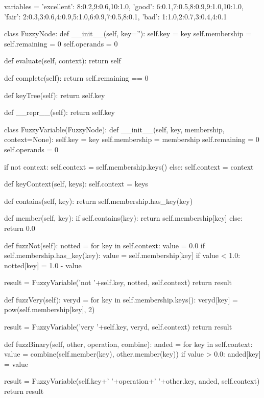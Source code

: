 \documentclass[12pt]{article}
\begin{document}
\begin{python}[]
variables = {
  'excellent': {8:0.2,9:0.6,10:1.0},
  'good': {6:0.1,7:0.5,8:0.9,9:1.0,10:1.0},
  'fair': {2:0.3,3:0.6,4:0.9,5:1.0,6:0.9,7:0.5,8:0.1},
  'bad': {1:1.0,2:0.7,3:0.4,4:0.1}
}

class FuzzyNode:
  def __init__(self, key=''):
    self.key = key
    self.membership = {}
    self.remaining = 0
    self.operands = 0

  def evaluate(self, context):
    return self

  def complete(self):
    return self.remaining == 0

  def keyTree(self):
    return self.key

  def __repr__(self):
    return self.key

class FuzzyVariable(FuzzyNode):
  def __init__(self, key, membership, context=None):
    self.key = key
    self.membership = membership
    self.remaining = 0
    self.operands = 0

    if not context:
      self.context = self.membership.keys()
    else:
      self.context = context

  def keyContext(self, keys):
    self.context = keys

  def contains(self, key):
    return self.membership.has_key(key)

  def member(self, key):
    if self.contains(key):
      return self.membership[key]
    else:
      return 0.0

  def fuzzNot(self):
    notted = {}
    for key in self.context:
      value = 0.0
      if self.membership.has_key(key):
        value = self.membership[key]
      if value < 1.0:
        notted[key] = 1.0 - value

    result = FuzzyVariable('not '+self.key, notted, self.context)
    return result

  def fuzzVery(self):
    veryd = {}
    for key in self.membership.keys():
      veryd[key] = pow(self.membership[key], 2)

    result = FuzzyVariable('very '+self.key, veryd, self.context)
    return result

  def fuzzBinary(self, other, operation, combine):
    anded = {}
    for key in self.context:
      value = combine(self.member(key), other.member(key))
      if value > 0.0:
        anded[key] = value

    result = FuzzyVariable(self.key+' '+operation+' '+other.key,
                           anded, self.context)
    return result


\end{python}
\end{document}
